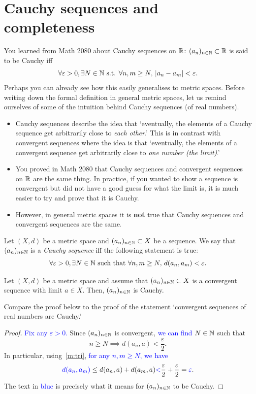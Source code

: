 \section{Cauchy sequences and completeness}
\label{sec:Cauchy}
You learned from Math 2080 about Cauchy sequences on $\mathbb{R}$: $(a_n)_{n\in\mathbb{N}}\subset \mathbb{R}$ is said to be Cauchy iff
\[
\forall \varepsilon>0,\exists N\in\mathbb{N}\text{ s.t. }\forall n,m\ge N, \, |a_n-a_m|<\varepsilon.
\]
Perhaps you can already see how this easily generalises to metric spaces. Before writing down the formal definition in general metric spaces, let us remind ourselves of some of the intuition behind Cauchy sequences (of real numbers).
\begin{rem}
	\begin{itemize}
		\item Cauchy sequences describe the idea that `eventually, the elements of a Cauchy sequence get arbitrarily close to \textit{each other}.' This is in contrast with convergent sequences where the idea is that `eventually, the elements of a convergent sequence get arbitrarily close to \textit{one number (the limit)}.'
		\item You proved in Math 2080 that Cauchy sequences and convergent sequences on $\mathbb{R}$ are the same thing. In practice, if you wanted to show a sequence is convergent but did not have a good guess for what the limit is, it is much easier to try and prove that it is Cauchy.
		\item However, in general metric spaces it is \textbf{not} true that Cauchy sequences and convergent sequences are the same.
	\end{itemize}
\end{rem}
\begin{defn}[Cauchy]
\label{defn:Cauchy}
Let $(X,d)$ be a metric space and $(a_n)_{n\in\mathbb{N}}\subset X$ be a sequence. We say that $(a_n)_{n\in\mathbb{N}}$ is a \textit{Cauchy sequence} iff the following statement is true:
\[
\forall \varepsilon>0,\exists N\in\mathbb{N}\text{ such that }\forall n,m\ge N, \, d(a_n,a_m)<\varepsilon.
\]
\end{defn}
\begin{lemma}
	\label{lem:cvg_imp_cauchy}
Let $(X,d)$ be a metric space and assume that $(a_n)_{n\in\mathbb{N}}\subset X$ is a convergent sequence with limit $a\in X$. Then, $(a_n)_{n\in\mathbb{N}}$ is Cauchy.
\end{lemma}
Compare the proof below to the proof of the statement `convergent sequences of real numbers are Cauchy.'
\begin{proof}
\textcolor{blue}{Fix any $\varepsilon>0$.} Since $(a_n)_{n\in\mathbb{N}}$ is convergent, \textcolor{blue}{we can find $N\in\mathbb{N}$} such that
\[
n\ge N \implies d(a_n,a)<\frac{\varepsilon}{2}.
\]
In particular, using~\ref{m:tri}, \textcolor{blue}{for any $n,m\ge N$, we have}
\[
\textcolor{blue}{d(a_n,a_m)} \le d(a_n,a) + d(a_m,a) \textcolor{blue}{<}\frac{\varepsilon}{2} + \frac{\varepsilon}{2} = \textcolor{blue}{\varepsilon}.
\]
The text in \textcolor{blue}{blue} is precisely what it means for $(a_n)_{n\in\mathbb{N}}$ to be Cauchy.
\end{proof}
